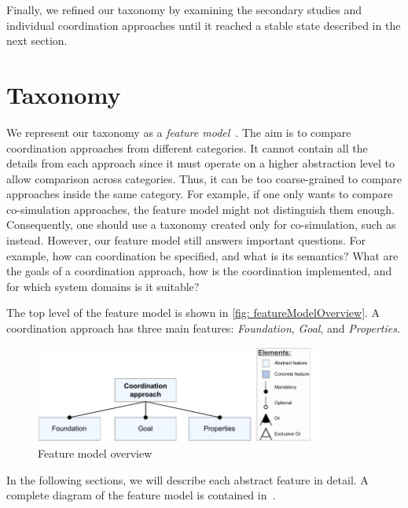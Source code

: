 \documentclass[runningheads]{llncs}
\begin{document}
Finally, we refined our taxonomy by examining the secondary studies and individual coordination approaches until it reached a stable state described in the next section.

\section{Taxonomy} \label{sec: taxonomy}
We represent our taxonomy as a \textit{feature model}~\cite{kangFeatureOrientedDomainAnalysis1990}.
The aim is to compare coordination approaches from different categories.
It cannot contain all the details from each approach since it must operate on a higher abstraction level to allow comparison across categories.
Thus, it can be too coarse-grained to compare approaches inside the same category.
For example, if one only wants to compare co-simulation approaches, the feature model might not distinguish them enough.
Consequently, one should use a taxonomy created only for co-simulation, such as~\cite{gomesCoSimulationSurvey2019} instead.
However, our feature model still answers important questions.
For example, how can coordination be specified, and what is its semantics?
What are the goals of a coordination approach, how is the coordination implemented, and for which system domains is it suitable?

The top level of the feature model is shown in \autoref{fig: featureModelOverview}.
A coordination approach has three main features: \textit{Foundation}, \textit{Goal}, and \textit{Properties}.

\begin{figure}[ht]
	\centering
	\includegraphics[width=0.85\textwidth]{images/root}
	\caption{Feature model overview}
	\label{fig: featureModelOverview}
\end{figure}

In the following sections, we will describe each abstract feature in detail.
A complete diagram of the feature model is contained in~\cite{timkrauterArtifactsCoordination2024}.
\end{document}
